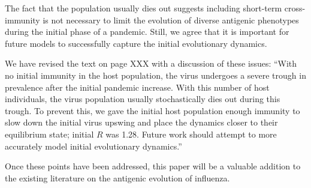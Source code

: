 \documentclass[11pt,oneside,letterpaper]{article}
\def\comment#1{
#1
}
\def\response#1{
\begin{bf}
#1
\end{bf}
}
\def\break{\vspace{0.2cm}}
\begin{document}
\response{The fact that the population usually dies out suggests including short-term cross-immunity is not necessary to limit the evolution of diverse antigenic phenotypes during the initial phase of a pandemic.  Still, we agree that it is important for future models to successfully capture the initial evolutionary dynamics.}

\response{We have revised the text on page XXX with a discussion of these issues: ``With no initial immunity in the host population, the virus undergoes a severe trough in prevalence after the initial pandemic increase.  With this number of host individuals, the virus population usually stochastically dies out during this trough.  To prevent this, we gave the initial host population enough immunity to slow down the initial virus upswing and place the dynamics closer to their equilibrium state; initial $R$ was 1.28.  Future work should attempt to more accurately model initial evolutionary dynamics.''}

\break

\comment{Once these points have been addressed, this paper will be a valuable addition to the existing literature on the antigenic evolution of influenza.}



\end{document}
